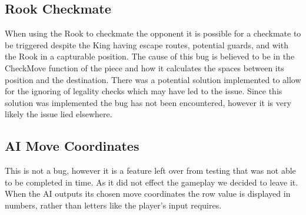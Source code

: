 \documentclass[conference]{IEEEtran}
\begin{document}
\subsection{Rook Checkmate}
When using the Rook to checkmate the opponent it is possible for a checkmate to be triggered despite the King having escape routes, potential guards, and with the Rook in a capturable position. The cause of this bug is believed to be in the CheckMove function of the piece and how it calculates the spaces between its position and the destination. There was a potential solution implemented to allow for the ignoring of legality checks which may have led to the issue. Since this solution was implemented the bug has not been encountered, however it is very likely the issue lied elsewhere. 

\subsection{AI Move Coordinates}
This is not a bug, however it is a feature left over from testing that was not able to be completed in time. As it did not effect the gameplay we decided to leave it. When the AI outputs its chosen move coordinates the row value is displayed in numbers, rather than letters like the player's input requires. 
\\
\end{document}
